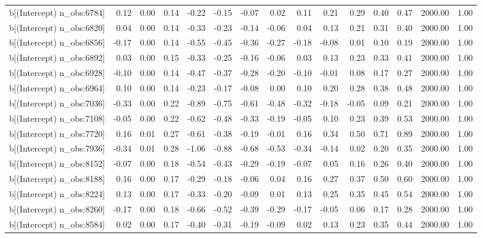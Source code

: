 \begin{table}[ht]
\begin{tabular}{rrrrrrrrrrrrrrr}
  b[(Intercept) n\_obs:6784] & 0.12 & 0.00 & 0.14 & -0.22 & -0.15 & -0.07 & 0.02 & 0.11 & 0.21 & 0.29 & 0.40 & 0.47 & 2000.00 & 1.00 \\ 
  b[(Intercept) n\_obs:6820] & 0.04 & 0.00 & 0.14 & -0.33 & -0.23 & -0.14 & -0.06 & 0.04 & 0.13 & 0.21 & 0.31 & 0.40 & 2000.00 & 1.00 \\ 
  b[(Intercept) n\_obs:6856] & -0.17 & 0.00 & 0.14 & -0.55 & -0.45 & -0.36 & -0.27 & -0.18 & -0.08 & 0.01 & 0.10 & 0.19 & 2000.00 & 1.00 \\ 
  b[(Intercept) n\_obs:6892] & 0.03 & 0.00 & 0.15 & -0.33 & -0.25 & -0.16 & -0.06 & 0.03 & 0.13 & 0.23 & 0.33 & 0.41 & 2000.00 & 1.00 \\ 
  b[(Intercept) n\_obs:6928] & -0.10 & 0.00 & 0.14 & -0.47 & -0.37 & -0.28 & -0.20 & -0.10 & -0.01 & 0.08 & 0.17 & 0.27 & 2000.00 & 1.00 \\ 
  b[(Intercept) n\_obs:6964] & 0.10 & 0.00 & 0.14 & -0.23 & -0.17 & -0.08 & 0.00 & 0.10 & 0.20 & 0.28 & 0.38 & 0.48 & 2000.00 & 1.00 \\ 
  b[(Intercept) n\_obs:7036] & -0.33 & 0.00 & 0.22 & -0.89 & -0.75 & -0.61 & -0.48 & -0.32 & -0.18 & -0.05 & 0.09 & 0.21 & 2000.00 & 1.00 \\ 
  b[(Intercept) n\_obs:7108] & -0.05 & 0.00 & 0.22 & -0.62 & -0.48 & -0.33 & -0.19 & -0.05 & 0.10 & 0.23 & 0.39 & 0.53 & 2000.00 & 1.00 \\ 
  b[(Intercept) n\_obs:7720] & 0.16 & 0.01 & 0.27 & -0.61 & -0.38 & -0.19 & -0.01 & 0.16 & 0.34 & 0.50 & 0.71 & 0.89 & 2000.00 & 1.00 \\ 
  b[(Intercept) n\_obs:7936] & -0.34 & 0.01 & 0.28 & -1.06 & -0.88 & -0.68 & -0.53 & -0.34 & -0.14 & 0.02 & 0.20 & 0.35 & 2000.00 & 1.00 \\ 
  b[(Intercept) n\_obs:8152] & -0.07 & 0.00 & 0.18 & -0.54 & -0.43 & -0.29 & -0.19 & -0.07 & 0.05 & 0.16 & 0.26 & 0.40 & 2000.00 & 1.00 \\ 
  b[(Intercept) n\_obs:8188] & 0.16 & 0.00 & 0.17 & -0.29 & -0.18 & -0.06 & 0.04 & 0.16 & 0.27 & 0.37 & 0.50 & 0.60 & 2000.00 & 1.00 \\ 
  b[(Intercept) n\_obs:8224] & 0.13 & 0.00 & 0.17 & -0.33 & -0.20 & -0.09 & 0.01 & 0.13 & 0.25 & 0.35 & 0.45 & 0.54 & 2000.00 & 1.00 \\ 
  b[(Intercept) n\_obs:8260] & -0.17 & 0.00 & 0.18 & -0.66 & -0.52 & -0.39 & -0.29 & -0.17 & -0.05 & 0.06 & 0.17 & 0.28 & 2000.00 & 1.00 \\ 
  b[(Intercept) n\_obs:8584] & 0.02 & 0.00 & 0.17 & -0.40 & -0.31 & -0.19 & -0.09 & 0.02 & 0.13 & 0.23 & 0.35 & 0.44 & 2000.00 & 1.00 \\ 

\end{tabular}
\end{table}
